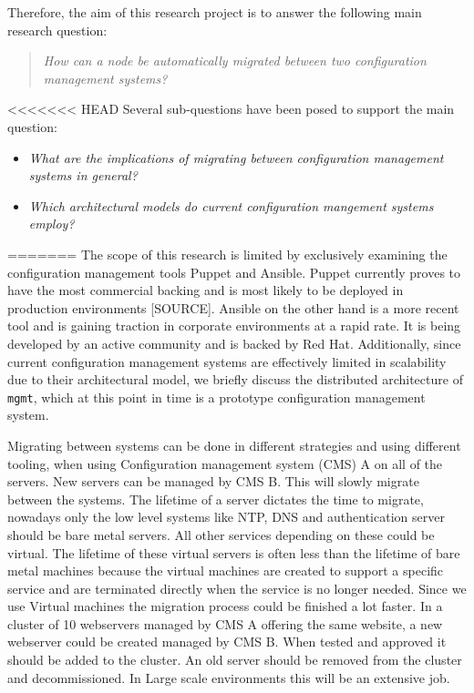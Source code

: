 Therefore, the aim of this research project is to answer the following main research question:

\begin{quote}
\textit{How can a node be automatically migrated between two configuration management systems?}
\end{quote}

\noindent
<<<<<<< HEAD
Several sub-questions have been posed to support the main question:
\begin{itemize}
    \setlength\itemsep{1pt}
    \item \textit{What are the implications of migrating between configuration management systems in general?}
    \item \textit{Which architectural models do current configuration mangement systems employ?}
\end{itemize}
=======
The scope of this research is limited by exclusively examining the configuration management tools Puppet and Ansible. Puppet currently proves to have the most commercial backing and is most likely to be deployed in production environments [SOURCE]. Ansible on the other hand is a more recent tool and is gaining traction in corporate environments at a rapid rate. It is being developed by an active community and is backed by Red Hat. Additionally, since current configuration management systems are effectively limited in scalability due to their architectural model, we briefly discuss the distributed architecture of \texttt{mgmt}, which at this point in time is a prototype configuration management system.

Migrating between systems can be done in different strategies and using different tooling, when using Configuration management system (CMS) A on all of the servers. New servers can be managed by CMS B. This will slowly migrate between the systems. The lifetime of a server dictates the time to migrate, nowadays only the low level systems like NTP, DNS and authentication server should be bare metal servers. All other services depending on these could be virtual. The lifetime of these virtual servers is often less than the lifetime of bare metal machines because the virtual machines are created to support a specific service and are terminated directly when the service is no longer needed. Since we use Virtual machines the migration process could be finished a lot faster. In a cluster of 10 webservers managed by CMS A offering the same website, a new webserver could be created managed by CMS B. When tested and approved it should be added to the cluster. An old server should be removed from the cluster and decommissioned. In Large scale environments this will be an extensive job.

